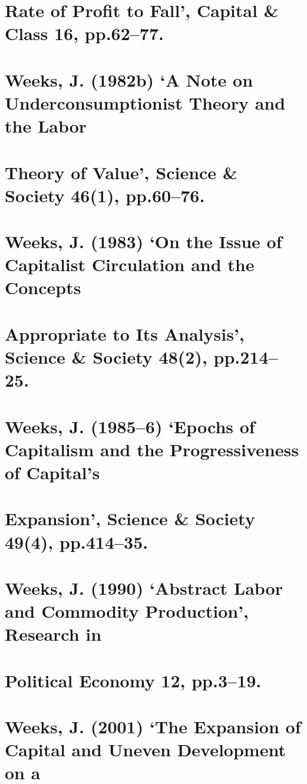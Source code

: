 \section{Rate of Profit to Fall’, Capital & Class 16, pp.62–77.}


\section{Weeks, J. (1982b) ‘A Note on Underconsumptionist Theory and the Labor}


\section{Theory of Value’, Science & Society 46(1), pp.60–76.}


\section{Weeks, J. (1983) ‘On the Issue of Capitalist Circulation and the Concepts}


\section{Appropriate to Its Analysis’, Science & Society 48(2), pp.214–25.}


\section{Weeks, J. (1985–6) ‘Epochs of Capitalism and the Progressiveness of Capital’s}


\section{Expansion’, Science & Society 49(4), pp.414–35.}


\section{Weeks, J. (1990) ‘Abstract Labor and Commodity Production’, Research in}


\section{Political Economy 12, pp.3–19.}


\section{Weeks, J. (2001) ‘The Expansion of Capital and Uneven Development on a}


